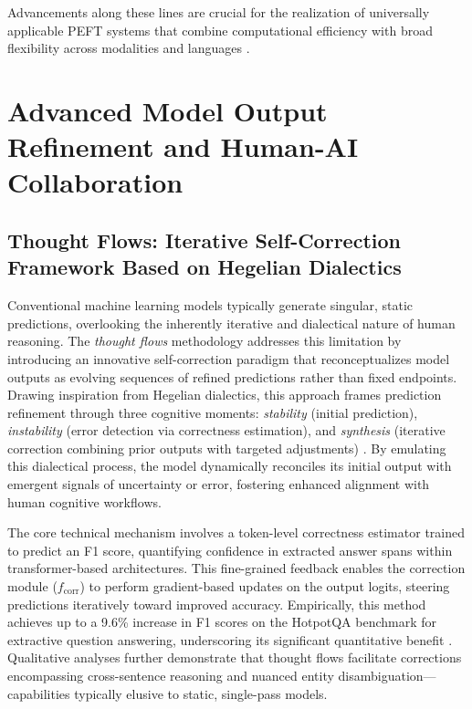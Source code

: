 Advancements along these lines are crucial for the realization of universally applicable PEFT systems that combine computational efficiency with broad flexibility across modalities and languages \cite{ref48}.

\section{Advanced Model Output Refinement and Human-AI Collaboration}

\subsection{Thought Flows: Iterative Self-Correction Framework Based on Hegelian Dialectics}

Conventional machine learning models typically generate singular, static predictions, overlooking the inherently iterative and dialectical nature of human reasoning. The \emph{thought flows} methodology addresses this limitation by introducing an innovative self-correction paradigm that reconceptualizes model outputs as evolving sequences of refined predictions rather than fixed endpoints. Drawing inspiration from Hegelian dialectics, this approach frames prediction refinement through three cognitive moments: \textit{stability} (initial prediction), \textit{instability} (error detection via correctness estimation), and \textit{synthesis} (iterative correction combining prior outputs with targeted adjustments) \cite{ref43}. By emulating this dialectical process, the model dynamically reconciles its initial output with emergent signals of uncertainty or error, fostering enhanced alignment with human cognitive workflows.

The core technical mechanism involves a token-level correctness estimator trained to predict an F1 score, quantifying confidence in extracted answer spans within transformer-based architectures. This fine-grained feedback enables the correction module ($f_{\text{corr}}$) to perform gradient-based updates on the output logits, steering predictions iteratively toward improved accuracy. Empirically, this method achieves up to a 9.6\% increase in F1 scores on the HotpotQA benchmark for extractive question answering, underscoring its significant quantitative benefit \cite{ref43}. Qualitative analyses further demonstrate that thought flows facilitate corrections encompassing cross-sentence reasoning and nuanced entity disambiguation—capabilities typically elusive to static, single-pass models.

